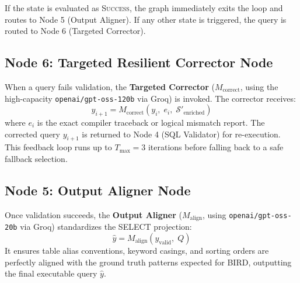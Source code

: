 If the state is evaluated as \textsc{Success}, the graph immediately exits the loop and routes to Node 5 (Output Aligner). If any other state is triggered, the query is routed to Node 6 (Targeted Corrector).

\subsection{Node 6: Targeted Resilient Corrector Node}
When a query fails validation, the \textbf{Targeted Corrector} ($M_{\mathrm{correct}}$, using the high-capacity \texttt{openai/gpt-oss-120b} via Groq) is invoked. The corrector receives:
\begin{equation}
    y_{i+1} = M_{\mathrm{correct}}(y_i, \; e_i, \; \mathcal{S}'_{\mathrm{enriched}})
\end{equation}
where $e_i$ is the exact compiler traceback or logical mismatch report. The corrected query $y_{i+1}$ is returned to Node 4 (SQL Validator) for re-execution. This feedback loop runs up to $T_{\max} = 3$ iterations before falling back to a safe fallback selection.

\subsection{Node 5: Output Aligner Node}
Once validation succeeds, the \textbf{Output Aligner} ($M_{\mathrm{align}}$, using \texttt{openai/gpt-oss-20b} via Groq) standardizes the SELECT projection:
\begin{equation}
    \hat{y} = M_{\mathrm{align}}(y_{\mathrm{valid}}, \; Q)
\end{equation}
It ensures table alias conventions, keyword casings, and sorting orders are perfectly aligned with the ground truth patterns expected for BIRD, outputting the final executable query $\hat{y}$.
